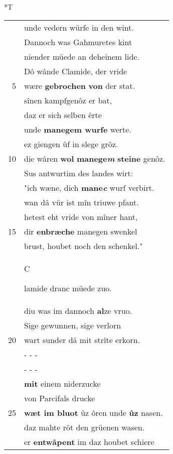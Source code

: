 \documentclass[8pt,a4paper,notitlepage]{article}
\begin{document}
\begin{table}[ht]
\begin{minipage}[t]{0.5\linewidth}
\end{minipage}
\hspace{0.5cm}
\begin{minipage}[t]{0.5\linewidth}
\small
\begin{center}*T
\end{center}
\begin{tabular}{rl}
 & unde vedern würfe in den wint.\\ 
 & Dannoch was Gahmuretes kint\\ 
 & niender müede an deheinem lide.\\ 
 & Dô wânde Clamide, der vride\\ 
5 & wære \textbf{gebrochen} \textbf{von} der stat.\\ 
 & sînen kampfgenôz er bat,\\ 
 & daz er sich selben êrte\\ 
 & unde \textbf{manegem wurfe} werte.\\ 
 & ez giengen ûf in slege grôz.\\ 
10 & die wâren \textbf{wol} \textbf{manege\textit{m}} \textbf{steine} genôz.\\ 
 & Sus antwurtim des landes wirt:\\ 
 & "ich wæne, dich \textbf{mane\textit{c}} wurf verbirt.\\ 
 & wan dâ vür ist mîn triuwe pfant.\\ 
 & hetest eht vride von mîner hant,\\ 
15 & dir \textbf{enbræche} manegen swenkel\\ 
 & brust, houbet noch den schenkel."\\ 
 & \begin{large}C\end{large}lamide dranc müede zuo.\\ 
 & diu was im dannoch \textbf{al}ze vruo.\\ 
 & Sige gewunnen, sige verlorn\\ 
20 & wart sunder dâ mit strîte erkorn.\\ 
 & \multicolumn{1}{l}{ - - - }\\ 
 & \multicolumn{1}{l}{ - - - }\\ 
 & \textbf{mit} einem niderzucke\\ 
 & von Parcifals drucke\\ 
25 & \textbf{wæt im bluot} ûz ôren unde \textbf{ûz} nasen.\\ 
 & daz mahte rôt den grüenen wasen.\\ 
 & er \textbf{entwâpent} im daz houbet schiere\\ 

\end{tabular}
\end{minipage}
\end{table}
\end{document}
